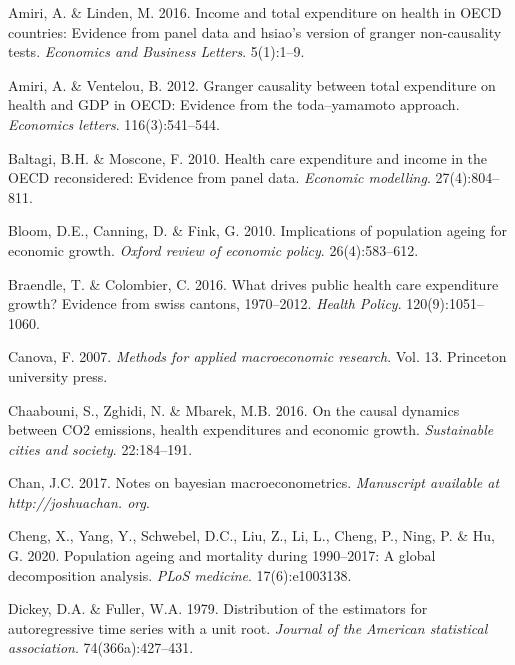 \documentclass[11pt,preprint, authoryear]{elsarticle}
\numberwithin{equation}{section}
\numberwithin{figure}{section}
\numberwithin{table}{section}
\newlength{\cslhangindent}
\newenvironment{CSLReferences}%
  {\setlength{\parindent}{0pt}%
  \everypar{\setlength{\hangindent}{\cslhangindent}}\ignorespaces}%
  {\par}
\begin{document}
\hypertarget{refs}{}
\begin{CSLReferences}{1}{0}
\leavevmode{}%
Amiri, A. \& Linden, M. 2016. Income and total expenditure on health in
OECD countries: Evidence from panel data and hsiao's version of granger
non-causality tests. \emph{Economics and Business Letters}. 5(1):1--9.

\leavevmode{}%
Amiri, A. \& Ventelou, B. 2012. Granger causality between total
expenditure on health and GDP in OECD: Evidence from the toda--yamamoto
approach. \emph{Economics letters}. 116(3):541--544.

\leavevmode{}%
Baltagi, B.H. \& Moscone, F. 2010. Health care expenditure and income in
the OECD reconsidered: Evidence from panel data. \emph{Economic
modelling}. 27(4):804--811.

\leavevmode{}%
Bloom, D.E., Canning, D. \& Fink, G. 2010. Implications of population
ageing for economic growth. \emph{Oxford review of economic policy}.
26(4):583--612.

\leavevmode{}%
Braendle, T. \& Colombier, C. 2016. What drives public health care
expenditure growth? Evidence from swiss cantons, 1970--2012.
\emph{Health Policy}. 120(9):1051--1060.

\leavevmode{}%
Canova, F. 2007. \emph{Methods for applied macroeconomic research}. Vol.
13. Princeton university press.

\leavevmode{}%
Chaabouni, S., Zghidi, N. \& Mbarek, M.B. 2016. On the causal dynamics
between CO2 emissions, health expenditures and economic growth.
\emph{Sustainable cities and society}. 22:184--191.

\leavevmode{}%
Chan, J.C. 2017. Notes on bayesian macroeconometrics. \emph{Manuscript
available at http://joshuachan. org}.

\leavevmode{}%
Cheng, X., Yang, Y., Schwebel, D.C., Liu, Z., Li, L., Cheng, P., Ning,
P. \& Hu, G. 2020. Population ageing and mortality during 1990--2017: A
global decomposition analysis. \emph{PLoS medicine}. 17(6):e1003138.

\leavevmode{}%
Dickey, D.A. \& Fuller, W.A. 1979. Distribution of the estimators for
autoregressive time series with a unit root. \emph{Journal of the
American statistical association}. 74(366a):427--431.


\end{CSLReferences}
\end{document}
